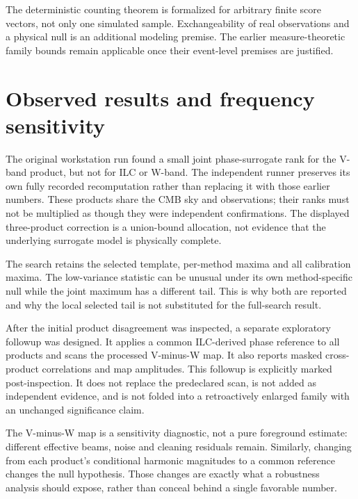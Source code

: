 The deterministic counting theorem is formalized for arbitrary finite score vectors, not only one simulated sample. Exchangeability of real observations and a physical null is an additional modeling premise. The earlier measure-theoretic family bounds remain applicable once their event-level premises are justified.

\section{Observed results and frequency sensitivity}

\begin{center}\small\end{center}

The original workstation run found a small joint phase-surrogate rank for the V-band product, but not for ILC or W-band. The independent runner preserves its own fully recorded recomputation rather than replacing it with those earlier numbers. These products share the CMB sky and observations; their ranks must not be multiplied as though they were independent confirmations. The displayed three-product correction is a union-bound allocation, not evidence that the underlying surrogate model is physically complete.

The search retains the selected template, per-method maxima and all calibration maxima. The low-variance statistic can be unusual under its own method-specific null while the joint maximum has a different tail. This is why both are reported and why the local selected tail is not substituted for the full-search result.

After the initial product disagreement was inspected, a separate exploratory followup was designed. It applies a common ILC-derived phase reference to all products and scans the processed V-minus-W map. It also reports masked cross-product correlations and map amplitudes. This followup is explicitly marked post-inspection. It does not replace the predeclared scan, is not added as independent evidence, and is not folded into a retroactively enlarged family with an unchanged significance claim.

The V-minus-W map is a sensitivity diagnostic, not a pure foreground estimate: different effective beams, noise and cleaning residuals remain. Similarly, changing from each product's conditional harmonic magnitudes to a common reference changes the null hypothesis. Those changes are exactly what a robustness analysis should expose, rather than conceal behind a single favorable number.


